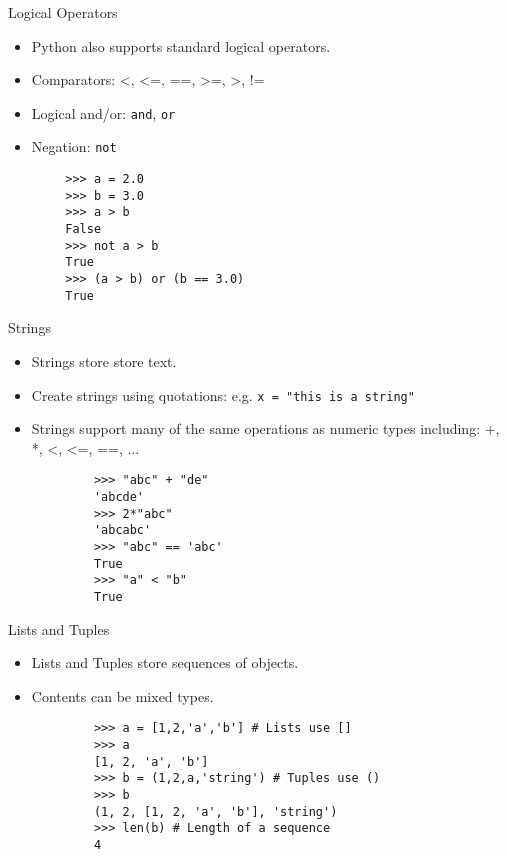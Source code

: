 \documentclass[serif,xcolor=pdftex,dvipsnames,table,hyperref={bookmarks=false,breaklinks}]{beamer}
\begin{document}
\begin{frame}[t,fragile]{Logical Operators}
	\begin{itemize}[<+->]
		\item Python also supports standard logical operators.
		\item Comparators: <, <=, ==, >=, >, !=
		\item Logical and/or: \verb|and|, \verb|or|
		\item Negation: \verb|not|
	\end{itemize}
	
	\pause
	\begin{tcolorbox}
		\begin{verbatim}
		>>> a = 2.0
		>>> b = 3.0
		>>> a > b
		False
		>>> not a > b
		True
		>>> (a > b) or (b == 3.0)
		True
	\end{verbatim}
	\end{tcolorbox}
\end{frame}

\begin{frame}[t,fragile]{Strings}
	\begin{itemize}[<+->]
		\item Strings store store text.
		\item Create strings using quotations: e.g. \verb|x = "this is a string"|
		\item Strings support many of the same operations as numeric types including: +, *, <, <=, ==, ...
	\end{itemize}

	\pause
	\begin{tcolorbox}
		\begin{verbatim}
			>>> "abc" + "de"
			'abcde'
			>>> 2*"abc"
			'abcabc'
			>>> "abc" == 'abc'
			True
			>>> "a" < "b"
			True
		\end{verbatim}
	\end{tcolorbox}

\end{frame}

\begin{frame}[t,fragile]{Lists and Tuples}
	\begin{itemize}[<+->]
		\item Lists and Tuples store sequences of objects.
		\item Contents can be mixed types.
	\end{itemize}

	\pause
	\begin{tcolorbox}
		\begin{verbatim}
			>>> a = [1,2,'a','b'] # Lists use []
			>>> a
			[1, 2, 'a', 'b']
			>>> b = (1,2,a,'string') # Tuples use ()
			>>> b
			(1, 2, [1, 2, 'a', 'b'], 'string')
			>>> len(b) # Length of a sequence
			4
		\end{verbatim}
	\end{tcolorbox}

\end{frame}
\end{document}
